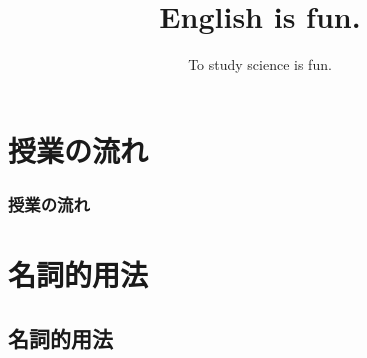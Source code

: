 \documentclass[aspectratio=169,xcolor={dvipsnames,table}]{beamer}
\title{English is fun.}
\subtitle{To study science is fun.}
\author{}
\institute[]{}
\date[]
\begin{document}
\begin{frame}[plain]
  \titlepage
\end{frame}

\section*{授業の流れ}
\begin{frame}[plain]
  \frametitle{授業の流れ}
  \tableofcontents
\end{frame}

\section{名詞的用法}
\subsection{名詞的用法}
\end{document}
